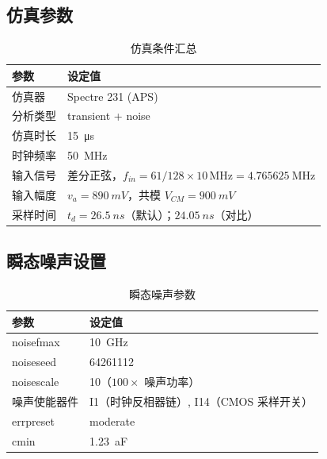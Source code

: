 \documentclass[journal]{IEEEtran}
\begin{document}
\subsection{仿真参数}
\begin{table}[!t]
\centering
\caption{仿真条件汇总}
\label{tab:conditions}
\renewcommand{\arraystretch}{1.2}
\begin{tabular}{ll}
\toprule
\textbf{参数} & \textbf{设定值} \\
\midrule
仿真器 & Spectre 231 (APS) \\
分析类型 & transient + noise \\
仿真时长 & \SI{15}{\us} \\
时钟频率 & \SI{50}{\MHz} \\
输入信号 & 差分正弦，$f_{in}=61/128\times 10\,\text{MHz}=\SI{4.765625}{\MHz}$ \\
输入幅度 & $v_a = \SI{890}{mV}$，共模 $V_{CM} = \SI{900}{mV}$ \\
采样时间 & $t_d = \SI{26.5}{ns}$（默认）；$\SI{24.05}{ns}$（对比） \\
\bottomrule
\end{tabular}
\end{table}

\subsection{瞬态噪声设置}
\begin{table}[!t]
\centering
\caption{瞬态噪声参数}
\label{tab:noise_settings}
\renewcommand{\arraystretch}{1.2}
\begin{tabular}{ll}
\toprule
\textbf{参数} & \textbf{设定值} \\
\midrule
noisefmax & \SI{10}{GHz} \\
noiseseed & 64261112 \\
noisescale & 10（$100\times$ 噪声功率） \\
噪声使能器件 & I1（时钟反相器链）, I14（CMOS 采样开关） \\
errpreset & moderate \\
cmin & \SI{1.23}{aF} \\
\bottomrule
\end{tabular}
\end{table}
\end{document}
